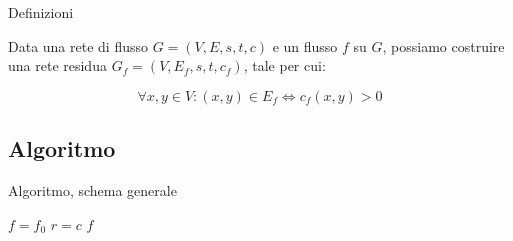 \begin{frame}{Definizioni}

\vspace{-9pt}
\begin{myboxtitle}
Data una rete di flusso $G=(V,E,s,t,c)$ e un flusso $f$ su $G$, 
possiamo costruire una \alert{rete residua} $G_f=(V,E_f,s,t,c_f)$, tale
per cui:

\[
  \forall x,y \in V: (x,y) \in E_f \Leftrightarrow c_f(x,y) > 0
\]
\end{myboxtitle}

\smallskip
\begin{center}
\end{center}

\end{frame}

\subsection{Algoritmo}

\begin{frame}{Algoritmo, schema generale}

\begin{Procedure}
\caption[A]{$\INTARRAY[\,]$ \Flusso(\Graph $G$, \Node $s$, \Node $t$, $\INTARRAY[\,]\ c$)}
$f = f_0$
$r = c$
\Return $f$
\end{Procedure}

\end{frame}

